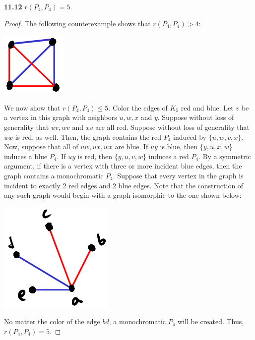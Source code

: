\documentclass[12pt]{article}
\begin{document}
\newpage\noindent\textbf{11.12} $r(P_4, P_4) = 5$.
\begin{proof}
    The following counterexample shows that $r(P_4, P_4) > 4$:
    \begin{center} \includegraphics{8.png} \end{center}
    
    We now show that $r(P_4, P_4) \leq 5$.
    Color the edges of $K_5$ red and blue.
    Let $v$ be a vertex in this graph with neighbors $u, w, x$ and $y$.
    Suppose without loss of generality that $uv, wv$ and $xv$ are all red.
    Suppose without loss of generality that $uw$ is red, as well.
    Then, the graph contains the red $P_4$ induced by $\{u, w, v, x\}$.
    Now, suppose that all of $uw, ux, wx$ are blue.
    If $uy$ is blue, then $\{y, u, x, w\}$ induces a blue $P_4$.
    If $uy$ is red, then $\{y, u, v, w\}$ induces a red $P_4$.
    By a symmetric argument, if there is a vertex with three or more incident blue edges, then the graph contains a monochromatic $P_4$.
    Suppose that every vertex in the graph is incident to exactly 2 red edges and 2 blue edges.
    Note that the construction of any such graph would begin with a graph isomorphic to the one shown below:
    \begin{center} \includegraphics[scale=.7]{9.png} \end{center}
    No matter the color of the edge $bd$, a monochromatic $P_4$ will be created.
    Thus, $r(P_4, P_4) = 5$.
\end{proof}
\end{document}
